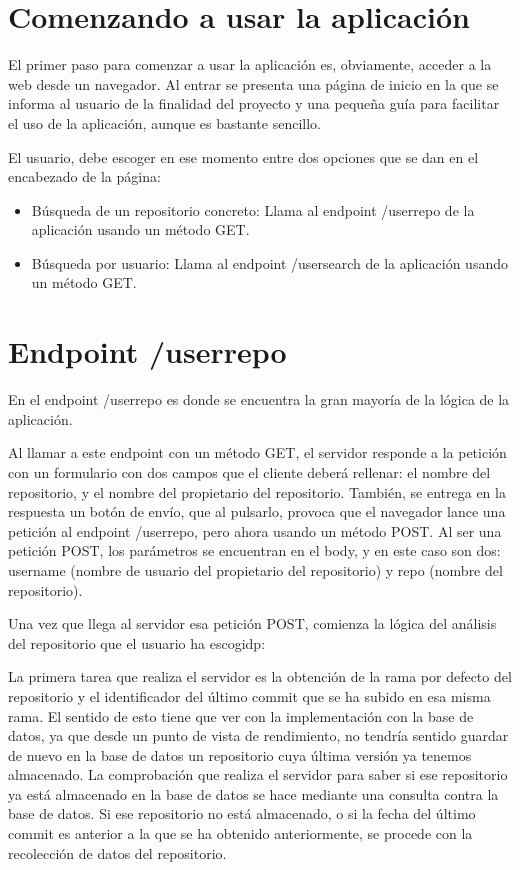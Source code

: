 \documentclass[a4paper, 12pt]{book}
\begin{document}
\section{Comenzando a usar la aplicación} 
\label{sec:Empezando a usar la aplicación}

El primer paso para comenzar a usar la aplicación es, obviamente, acceder a la web desde un navegador. Al entrar se presenta una página de inicio en la que se informa al usuario de la finalidad del proyecto y una pequeña guía para facilitar el uso de la aplicación, aunque es bastante sencillo.

El usuario, debe escoger en ese momento entre dos opciones que se dan en el encabezado de la página:

\begin{itemize}
  \item Búsqueda de un repositorio concreto: Llama al endpoint /userrepo de la aplicación usando un método GET.
  \item Búsqueda por usuario: Llama al endpoint /usersearch de la aplicación usando un método GET.
\end{itemize}

\section{Endpoint /userrepo} 
\label{sec:/userrepo}

En el endpoint /userrepo es donde se encuentra la gran mayoría de la lógica de la aplicación.

Al llamar a este endpoint con un método GET, el servidor responde a la petición con un formulario con dos campos que el cliente deberá rellenar: el nombre del repositorio, y el nombre del propietario del repositorio. También, se entrega en la respuesta un botón de envío, que al pulsarlo, provoca que el navegador lance una petición al endpoint /userrepo, pero ahora usando un método POST. Al ser una petición POST, los parámetros se encuentran en el body, y en este caso son dos: username (nombre de usuario del propietario del repositorio) y repo (nombre del repositorio).

Una vez que llega al servidor esa petición POST, comienza la lógica del análisis del repositorio que el usuario ha escogidp:

La primera tarea que realiza el servidor es la obtención de la rama por defecto del repositorio y el identificador del último commit que se ha subido en esa misma rama. El sentido de esto tiene que ver con la implementación con la base de datos, ya que desde un punto de vista de rendimiento, no tendría sentido guardar de nuevo en la base de datos un repositorio cuya última versión ya tenemos almacenado. La comprobación que realiza el servidor para saber si ese repositorio ya está almacenado en la base de datos se hace mediante una consulta contra la base de datos. Si ese repositorio no está almacenado, o si la fecha del último commit es anterior a la que se ha obtenido anteriormente, se procede con la recolección de datos del repositorio.
\end{document}
